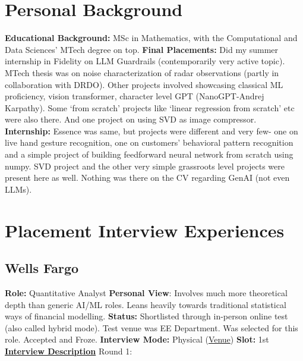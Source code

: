 \documentclass[12pt]{article}
\begin{document}
\section{Personal Background}
\textbf{Educational Background:} MSc in Mathematics, with the Computational and Data Sciences' MTech degree on top. 
\newline
\newline
\textbf{Final Placements: } Did my summer internship in Fidelity on LLM Guardrails (contemporarily very active topic). 
MTech thesis was on noise characterization of radar observations (partly in collaboration with DRDO).
Other projects involved showcasing classical ML proficiency, vision transformer, character level GPT (NanoGPT-Andrej Karpathy). Some `from scratch' projects like `linear regression from scratch' etc were also there. And one project on using SVD as image compressor.
\newline
\newline
\textbf{Internship:} Essence was same, but projects were different and very few- one on live hand gesture recognition, one on customers' behavioral pattern recognition and a simple project of building feedforward neural network from scratch using numpy. SVD project and the other very simple grassroots level projects were present here as well. Nothing was there on the CV regarding GenAI (not even LLMs).

\section{Placement Interview Experiences}
\subsection{Wells Fargo}
\textbf{Role:} Quantitative Analyst
\newline
\textbf{Personal View}: Involves much more theoretical depth than generic AI/ML roles. Leans heavily towards traditional statistical ways of financial modelling.
\newline
\textbf{Status:} Shortlisted through in-person online test (also called hybrid mode). Test venue was EE Department. Was selected for this role. Accepted and Froze.
\newline
\textbf{Interview Mode:} Physical (\href{https://maps.app.goo.gl/jMx4j9REmH2mdeeA6}{Venue})
\newline
\textbf{Slot:} 1st
\vspace{10pt}
\newline
\underline{\textbf{Interview Description}}
\newline
\newline
Round 1: 
\end{document}
